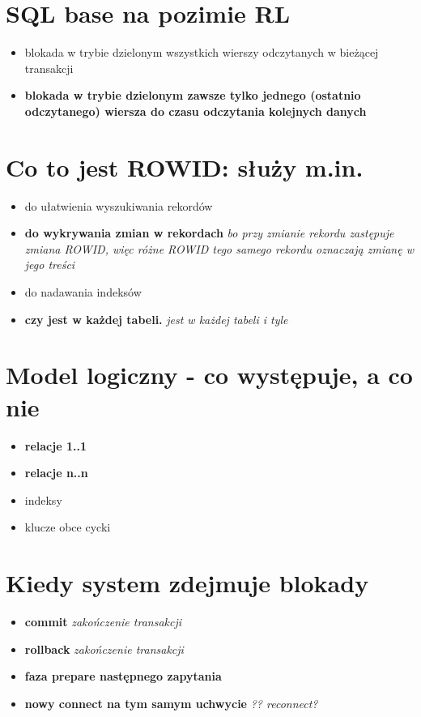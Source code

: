 \documentclass[a4paper,twoside]{article}
\begin{document}
  \section{SQL base na pozimie RL}
      \begin{itemize}
      \item blokada w trybie dzielonym wszystkich wierszy odczytanych w bieżącej transakcji
      \item \textbf{blokada w trybie dzielonym zawsze tylko jednego (ostatnio odczytanego) wiersza do czasu odczytania kolejnych danych}
      \end{itemize}

  \section{Co to jest ROWID: służy m.in.}
      \begin{itemize}
      \item do ułatwienia wyszukiwania rekordów
      \item \textbf{do wykrywania zmian w rekordach} \emph{bo przy zmianie rekordu zastępuje zmiana ROWID, więc różne ROWID tego samego rekordu oznaczają zmianę w jego treści}
      \item  do nadawania indeksów 
      \item \textbf{czy jest w każdej tabeli.} \emph{jest w każdej tabeli i tyle}
      \end{itemize}

  \section{Model logiczny - co występuje, a co nie}
      \begin{itemize}
      \item \textbf{relacje 1..1}
      \item \textbf{relacje n..n}
      \item indeksy
      \item klucze obce cycki
      \end{itemize}

  \section{Kiedy system zdejmuje blokady}
      \begin{itemize}
      \item \textbf{commit} \emph{zakończenie transakcji}
      \item \textbf{rollback} \emph{zakończenie transakcji}
      \item \textbf{faza prepare następnego zapytania}
      \item \textbf{nowy connect na tym samym uchwycie} \emph{?? reconnect?}
      \end{itemize}
\end{document}
